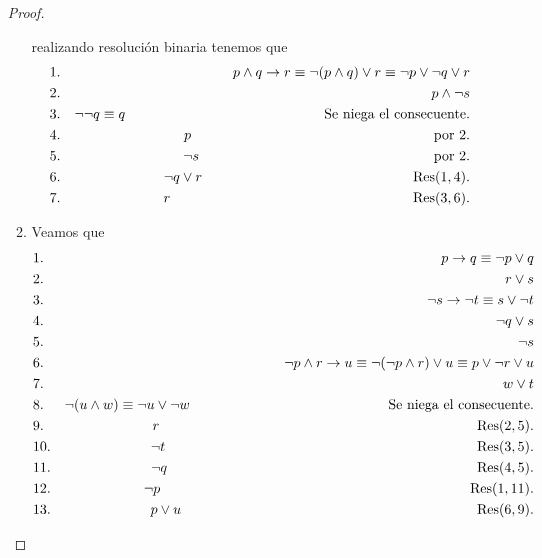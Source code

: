 \documentclass{article}
\begin{document}
\begin{itemize}
\begin{proof}
\begin{enumerate}
      realizando resolución binaria tenemos que
      \begin{eqnarray*}
        &1.& p \land q \rightarrow r \equiv \neg (p \land q) \lor r \equiv \neg p \lor \neg q \lor r\\
        &2.& p \land \neg s\\
        &3.& \neg \neg q \equiv q \hspace*{5cm} \text{Se niega el consecuente.}\\
        &4.& p \hspace*{6.1cm} \text{por } 2.\\
        &5.& \neg s \hspace*{5.9cm} \text{por } 2.\\
        &6.& \neg q \lor r \hspace*{5.3cm} \text{Res}(1,4).\\
        &7.& r \hspace*{6.1cm} \text{Res}(3,6).
      \end{eqnarray*}
    \item Veamos que
      \begin{eqnarray*}
        &1.& p \rightarrow q \equiv \neg p \lor q\\
        &2.& r \lor s\\
        &3.& \neg s \rightarrow \neg t \equiv s \lor \neg t\\
        &4.& \neg q \lor s\\
        &5.& \neg s\\
        &6.& \neg p \land r \rightarrow  u \equiv \neg (\neg p \land r) \lor u \equiv p \lor \neg r \lor u\\
        &7.& w \lor t\\
        &8.& \neg (u \land w) \equiv \neg u \lor \neg w \hspace*{5cm} \text{Se niega el consecuente.}\\
        &9.& r \hspace*{8cm} \text{Res}(2,5).\\
        &10.& \neg t \hspace*{7.85cm} \text{Res}(3,5).\\
        &11.& \neg q \hspace*{7.8cm} \text{Res}(4,5).\\
        &12.& \neg p \hspace*{7.8cm} \text{Res}(1,11).\\
        &13.& p \lor u \hspace*{7.45cm} \text{Res}(6,9).\\

\end{eqnarray*}
\end{enumerate}
\end{proof}
\end{itemize}
\end{document}
